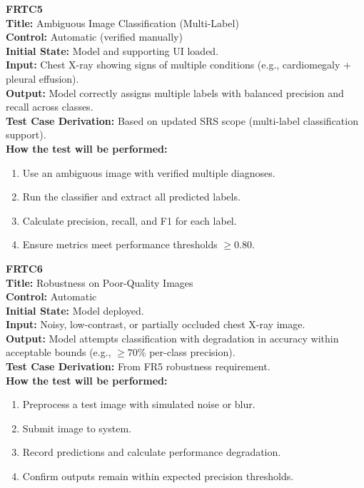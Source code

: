 \documentclass[12pt, titlepage]{article}
\begin{document}
\vspace{1em}

\textbf{FRTC5}\\
\textbf{Title:} Ambiguous Image Classification (Multi-Label)\\
\textbf{Control:} Automatic (verified manually)\\
\textbf{Initial State:} Model and supporting UI loaded.\\
\textbf{Input:} Chest X-ray showing signs of multiple conditions (e.g., cardiomegaly + pleural effusion).\\
\textbf{Output:} Model correctly assigns multiple labels with balanced precision and recall across classes.\\
\textbf{Test Case Derivation:} Based on updated SRS scope (multi-label classification support).\\
\textbf{How the test will be performed:}
\begin{enumerate}
  \item Use an ambiguous image with verified multiple diagnoses.
  \item Run the classifier and extract all predicted labels.
  \item Calculate precision, recall, and F1 for each label.
  \item Ensure metrics meet performance thresholds \( \geq 0.80 \).
\end{enumerate}

\vspace{1em}

\textbf{FRTC6}\\
\textbf{Title:} Robustness on Poor-Quality Images\\
\textbf{Control:} Automatic\\
\textbf{Initial State:} Model deployed.\\
\textbf{Input:} Noisy, low-contrast, or partially occluded chest X-ray image.\\
\textbf{Output:} Model attempts classification with degradation in accuracy within acceptable bounds (e.g., \( \geq 70\% \) per-class precision).\\
\textbf{Test Case Derivation:} From FR5 robustness requirement.\\
\textbf{How the test will be performed:}
\begin{enumerate}
  \item Preprocess a test image with simulated noise or blur.
  \item Submit image to system.
  \item Record predictions and calculate performance degradation.
  \item Confirm outputs remain within expected precision thresholds.
\end{enumerate}
\end{document}
